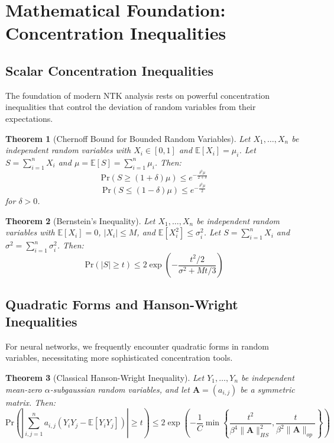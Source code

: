 \documentclass{article}
\newtheorem{theorem}{Theorem}[section]
\newcommand{\E}{\mathbb{E}}
\newcommand{\Pr}{\text{Pr}}
\begin{document}
\newpage

\section{Mathematical Foundation: Concentration Inequalities}

\subsection{Scalar Concentration Inequalities}

The foundation of modern NTK analysis rests on powerful concentration inequalities that control the deviation of random variables from their expectations.

\begin{theorem}[Chernoff Bound for Bounded Random Variables]
Let $X_1, \ldots, X_n$ be independent random variables with $X_i \in [0,1]$ and $\E[X_i] = \mu_i$. Let $S = \sum_{i=1}^n X_i$ and $\mu = \E[S] = \sum_{i=1}^n \mu_i$. Then:
$$\Pr(S \geq (1+\delta)\mu) \leq e^{-\frac{\delta^2 \mu}{2+\delta}}$$
$$\Pr(S \leq (1-\delta)\mu) \leq e^{-\frac{\delta^2 \mu}{2}}$$
for $\delta > 0$.
\end{theorem}

\begin{theorem}[Bernstein's Inequality]
Let $X_1, \ldots, X_n$ be independent random variables with $\E[X_i] = 0$, $|X_i| \leq M$, and $\E[X_i^2] \leq \sigma_i^2$. Let $S = \sum_{i=1}^n X_i$ and $\sigma^2 = \sum_{i=1}^n \sigma_i^2$. Then:
$$\Pr(|S| \geq t) \leq 2\exp\left(-\frac{t^2/2}{\sigma^2 + Mt/3}\right)$$
\end{theorem}

\subsection{Quadratic Forms and Hanson-Wright Inequalities}

For neural networks, we frequently encounter quadratic forms in random variables, necessitating more sophisticated concentration tools.

\begin{theorem}[Classical Hanson-Wright Inequality]
Let $Y_1, \ldots, Y_n$ be independent mean-zero $\alpha$-subgaussian random variables, and let $\mathbf{A} = (a_{i,j})$ be a symmetric matrix. Then:
$$\Pr\left(\left|\sum_{i,j=1}^n a_{i,j}(Y_i Y_j - \E[Y_i Y_j])\right| \geq t\right) \leq 2\exp\left(-\frac{1}{C}\min\left\{\frac{t^2}{\beta^4\|\mathbf{A}\|_{HS}^2}, \frac{t}{\beta^2\|\mathbf{A}\|_{op}}\right\}\right)$$
\end{theorem}
\end{document}
